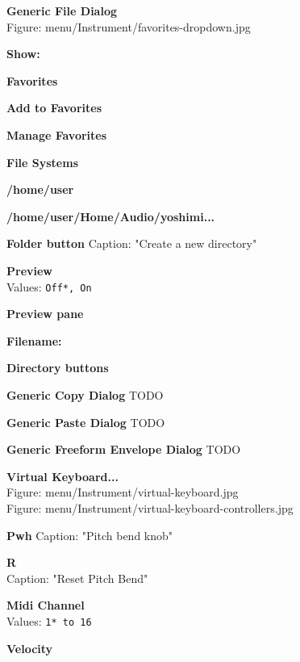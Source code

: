 \documentclass[
 11pt,
 twoside,
 a4paper,
 headinclude,
 footinclude,
 final                                 %
]{article}
\begin{document}
\begin{enumber}
   \item \textbf{Generic File Dialog} \\
      Figure: menu/Instrument/favorites-dropdown.jpg
      \begin{enumber}
         \item \textbf{Show:}
         \item \textbf{Favorites}
         \begin{enumber}
            \item \textbf{Add to Favorites}
            \item \textbf{Manage Favorites}
            \item \textbf{File Systems}
            \item \textbf{/home/user}
            \item \textbf{/home/user/Home/Audio/yoshimi...}
         \end{enumber}
         \item \textbf{Folder button}
            Caption: "Create a new directory"
         \item \textbf{Preview} \\
            Values: \texttt{Off*, On}
         \item \textbf{Preview pane}
         \item \textbf{Filename:}
         \item \textbf{Directory buttons}
      \end{enumber}
   \item \textbf{Generic Copy Dialog}
      TODO
   \item \textbf{Generic Paste Dialog}
      TODO
   \item \textbf{Generic Freeform Envelope Dialog}
      TODO
   \item \textbf{Virtual Keyboard...} \\
      Figure: menu/Instrument/virtual-keyboard.jpg \\
      Figure: menu/Instrument/virtual-keyboard-controllers.jpg
      \begin{enumber}
         \item \textbf{Pwh}
Caption: "Pitch bend knob"
         \item \textbf{R} \\
            Caption: "Reset Pitch Bend"
         \item \textbf{Midi Channel} \\
            Values: \texttt{1* to 16}
         \item \textbf{Velocity} \\

\end{enumber}
\end{enumber}
\end{document}
